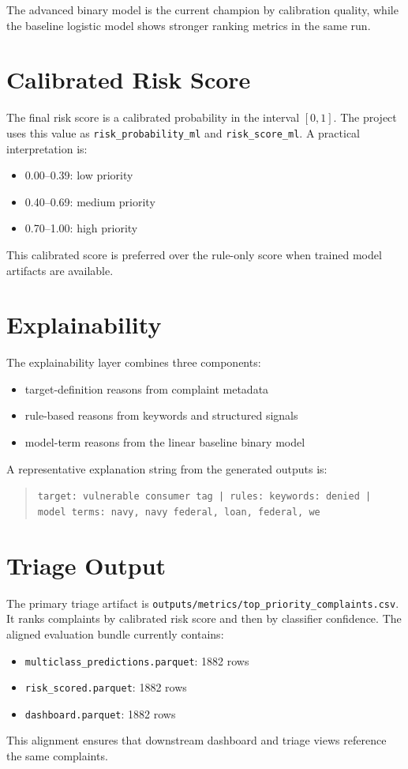 \documentclass[11pt]{article}
\begin{document}
The advanced binary model is the current champion by calibration quality, while the baseline logistic model shows stronger ranking metrics in the same run.

\section{Calibrated Risk Score}
The final risk score is a calibrated probability in the interval $[0, 1]$. The project uses this value as \texttt{risk\_probability\_ml} and \texttt{risk\_score\_ml}. A practical interpretation is:
\begin{itemize}
\item 0.00--0.39: low priority
\item 0.40--0.69: medium priority
\item 0.70--1.00: high priority
\end{itemize}
This calibrated score is preferred over the rule-only score when trained model artifacts are available.

\section{Explainability}
The explainability layer combines three components:
\begin{itemize}
\item target-definition reasons from complaint metadata
\item rule-based reasons from keywords and structured signals
\item model-term reasons from the linear baseline binary model
\end{itemize}
A representative explanation string from the generated outputs is:

\begin{quote}
\texttt{target: vulnerable consumer tag | rules: keywords: denied | model terms: navy, navy federal, loan, federal, we}
\end{quote}

\section{Triage Output}
The primary triage artifact is \texttt{outputs/metrics/top\_priority\_complaints.csv}. It ranks complaints by calibrated risk score and then by classifier confidence. The aligned evaluation bundle currently contains:
\begin{itemize}
\item \texttt{multiclass\_predictions.parquet}: 1882 rows
\item \texttt{risk\_scored.parquet}: 1882 rows
\item \texttt{dashboard.parquet}: 1882 rows
\end{itemize}
This alignment ensures that downstream dashboard and triage views reference the same complaints.
\end{document}
